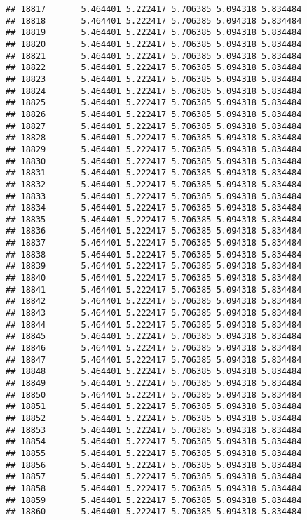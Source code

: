 \documentclass[
]{article}
\begin{document}
\begin{verbatim}
## 18817       5.464401 5.222417 5.706385 5.094318 5.834484
## 18818       5.464401 5.222417 5.706385 5.094318 5.834484
## 18819       5.464401 5.222417 5.706385 5.094318 5.834484
## 18820       5.464401 5.222417 5.706385 5.094318 5.834484
## 18821       5.464401 5.222417 5.706385 5.094318 5.834484
## 18822       5.464401 5.222417 5.706385 5.094318 5.834484
## 18823       5.464401 5.222417 5.706385 5.094318 5.834484
## 18824       5.464401 5.222417 5.706385 5.094318 5.834484
## 18825       5.464401 5.222417 5.706385 5.094318 5.834484
## 18826       5.464401 5.222417 5.706385 5.094318 5.834484
## 18827       5.464401 5.222417 5.706385 5.094318 5.834484
## 18828       5.464401 5.222417 5.706385 5.094318 5.834484
## 18829       5.464401 5.222417 5.706385 5.094318 5.834484
## 18830       5.464401 5.222417 5.706385 5.094318 5.834484
## 18831       5.464401 5.222417 5.706385 5.094318 5.834484
## 18832       5.464401 5.222417 5.706385 5.094318 5.834484
## 18833       5.464401 5.222417 5.706385 5.094318 5.834484
## 18834       5.464401 5.222417 5.706385 5.094318 5.834484
## 18835       5.464401 5.222417 5.706385 5.094318 5.834484
## 18836       5.464401 5.222417 5.706385 5.094318 5.834484
## 18837       5.464401 5.222417 5.706385 5.094318 5.834484
## 18838       5.464401 5.222417 5.706385 5.094318 5.834484
## 18839       5.464401 5.222417 5.706385 5.094318 5.834484
## 18840       5.464401 5.222417 5.706385 5.094318 5.834484
## 18841       5.464401 5.222417 5.706385 5.094318 5.834484
## 18842       5.464401 5.222417 5.706385 5.094318 5.834484
## 18843       5.464401 5.222417 5.706385 5.094318 5.834484
## 18844       5.464401 5.222417 5.706385 5.094318 5.834484
## 18845       5.464401 5.222417 5.706385 5.094318 5.834484
## 18846       5.464401 5.222417 5.706385 5.094318 5.834484
## 18847       5.464401 5.222417 5.706385 5.094318 5.834484
## 18848       5.464401 5.222417 5.706385 5.094318 5.834484
## 18849       5.464401 5.222417 5.706385 5.094318 5.834484
## 18850       5.464401 5.222417 5.706385 5.094318 5.834484
## 18851       5.464401 5.222417 5.706385 5.094318 5.834484
## 18852       5.464401 5.222417 5.706385 5.094318 5.834484
## 18853       5.464401 5.222417 5.706385 5.094318 5.834484
## 18854       5.464401 5.222417 5.706385 5.094318 5.834484
## 18855       5.464401 5.222417 5.706385 5.094318 5.834484
## 18856       5.464401 5.222417 5.706385 5.094318 5.834484
## 18857       5.464401 5.222417 5.706385 5.094318 5.834484
## 18858       5.464401 5.222417 5.706385 5.094318 5.834484
## 18859       5.464401 5.222417 5.706385 5.094318 5.834484
## 18860       5.464401 5.222417 5.706385 5.094318 5.834484

\end{verbatim}
\end{document}
